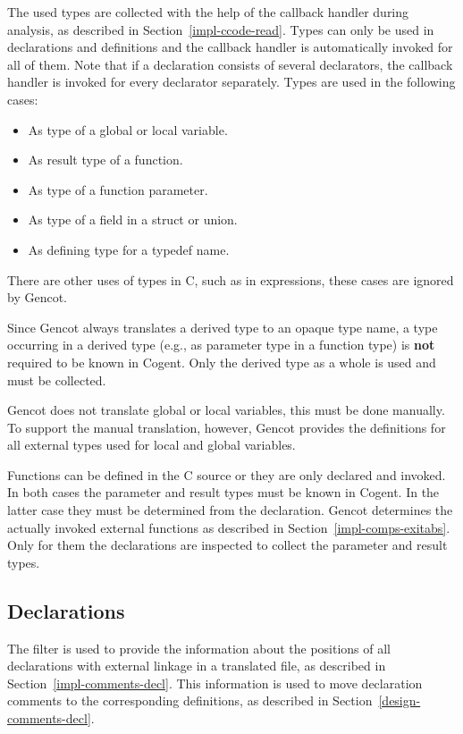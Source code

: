 The used types are collected with the help of the callback handler during analysis, as described in 
Section~\ref{impl-ccode-read}. Types can only be used in declarations and definitions and the callback handler is
automatically invoked for all of them. Note that if a declaration consists of several declarators, the callback
handler is invoked for every declarator separately. Types are used in the following cases:
\begin{itemize}
\item As type of a global or local variable.
\item As result type of a function.
\item As type of a function parameter.
\item As type of a field in a struct or union.
\item As defining type for a typedef name.
\end{itemize}
There are other uses of types in C, such as in  expressions, these cases are ignored by Gencot.

Since Gencot always translates a derived type to an opaque type name, a type occurring in a derived type (e.g.,
as parameter type in a function type) is \textbf{not} required to be known in Cogent. Only the derived type
as a whole is used and must be collected.

Gencot does not translate global or local variables, this must be done manually. To support the manual translation, 
however, Gencot provides the definitions for all external types used for local and global variables.

Functions can be defined in the C source or they are only declared and invoked. In both cases the parameter and result
types must be known in Cogent. In the latter case they must be determined from the declaration. Gencot determines the
actually invoked external functions as described in Section~\ref{impl-comps-exitabs}. Only for them the declarations 
are inspected to collect the parameter and result types.

\subsection{Declarations}
\label{impl-comps-decls}

The filter  is used to provide the information about the positions of all declarations with
external linkage in
a translated file, as described in Section~\ref{impl-comments-decl}. This information is used to move declaration
comments to the corresponding definitions, as described in Section~\ref{design-comments-decl}.

